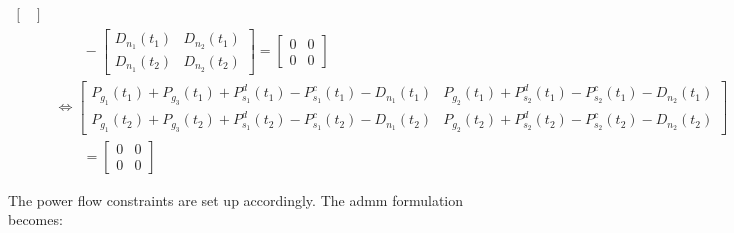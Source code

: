 \begin{subequations}
\begin{align}
\begin{bmatrix}
		\end{bmatrix} \nonumber \\
		& \qquad - \begin{bmatrix}
			D_{n_1}(t_1) & D_{n_2}(t_1) \\
			D_{n_1}(t_2) & D_{n_2}(t_2)
		\end{bmatrix} = \begin{bmatrix}
			0 & 0 \\
			0 & 0
		\end{bmatrix} \nonumber \\
		& \Leftrightarrow \begin{bmatrix}
			P_{g_1}(t_1) + P_{g_3}(t_1) + P_{s_1}^d(t_1) - P_{s_1}^c(t_1) - D_{n_1}(t_1) & P_{g_2}(t_1) + P_{s_2}^d(t_1) - P_{s_2}^c(t_1) - D_{n_2}(t_1) \\
			P_{g_1}(t_2) + P_{g_3}(t_2) + P_{s_1}^d(t_2) - P_{s_1}^c(t_2) - D_{n_1}(t_2) & P_{g_2}(t_2) + P_{s_2}^d(t_2) - P_{s_2}^c(t_2) - D_{n_2}(t_2)
		\end{bmatrix} \\
		& \qquad = \begin{bmatrix}
			0 & 0 \\
			0 & 0
		\end{bmatrix} \nonumber
	\end{align}
\end{subequations}

The power flow constraints are set up accordingly. The \gls{admm} formulation becomes:

